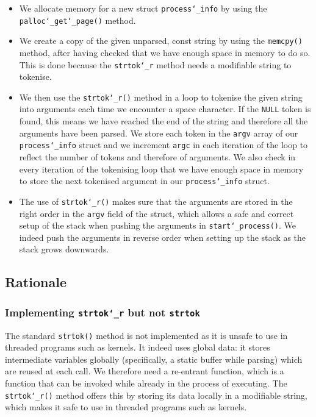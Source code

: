 \documentclass{article}
\renewcommand{\_}{\char`_}
\begin{document}
\begin{itemize}

\item We allocate memory for a new struct \texttt{process\_info} by using the \texttt{palloc\_get\_page()} method.
\item We create a copy of the given unparsed, const string by using the \texttt{memcpy()} method, after having checked that we have enough space in memory to do so. This is done because the \texttt{strtok\_r} method needs a modifiable string to tokenise.
\item We then use the \texttt{strtok\_r()} method in a loop to tokenise the given string into arguments each time we encounter a space character. If the \texttt{NULL} token is found, this means we have reached the end of the string and therefore all the arguments have been parsed. We store each token in the \texttt{argv} array of our \texttt{process\_info} struct and we increment \texttt{argc} in each iteration of the loop to reflect the number of tokens and therefore of arguments. We also check in every iteration of the tokenising loop that we have enough space in memory to store the next tokenised argument in our \texttt{process\_info} struct.
\item The use of \texttt{strtok\_r()} makes sure that the arguments are stored in the right order in the \texttt{argv} field of the struct, which allows a safe and correct setup of the stack when pushing the arguments in \texttt{start\_process()}.
We indeed push the arguments in reverse order when setting up the stack as the stack grows downwards.

\end{itemize}

\subsection{Rationale}

\subsubsection{Implementing \texttt{strtok\_r} but not \texttt{strtok}}

The standard \texttt{strtok()} method is not implemented as it is unsafe to use in threaded programs such as kernels. It indeed uses global data: it stores intermediate variables globally (specifically, a static buffer while parsing) which are reused at each call. We therefore need a re-entrant function, which is a function that can be invoked while already in the process of executing. The \texttt{strtok\_r()} method offers this by storing its data locally in a modifiable string, which makes it safe to use in threaded programs such as kernels.
\end{document}
